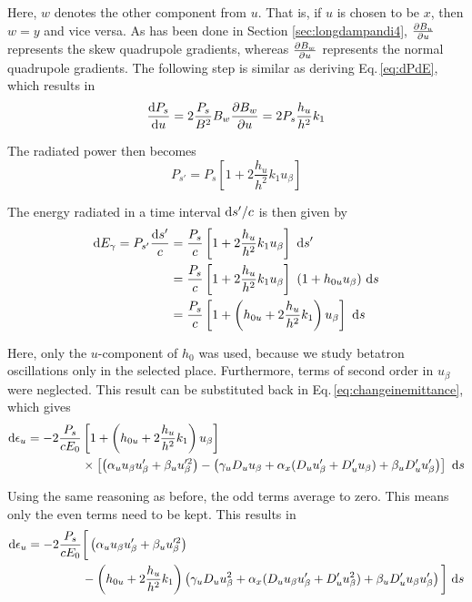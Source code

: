 Here, $w$ denotes the other component from $u$. That is, if $u$ is chosen to be $x$, then $w = y$ and vice versa. As has been done in Section \ref{sec:longdampandi4}, $\frac{\partial {B_u}}{\partial {u}}$ represents the skew quadrupole gradients, whereas $\frac{\partial {B_w}}{\partial {u}}$ represents the normal quadrupole gradients. The following step is similar as deriving Eq.\,\ref{eq:dPdE}, which results in
\begin{equation}
    \frac{\text{d} {P_s}}{\text{d} {u}} = 2 \frac{P_s}{B^2} B_w \frac{\partial {B_w}}{\partial {u}} = 2 P_s \frac{h_u}{h^2} k_1
\end{equation}

The radiated power then becomes
\begin{equation}
    P_{s'} = P_s \left[ 1 + 2 \frac{h_u}{h^2} k_1 u_\beta \right]
\end{equation}

The energy radiated in a time interval $\text{d} s' / c$ is then given by
\begin{align}
    \text{d} E_\gamma = P_{s'} \frac{\text{d} s'}{c} &= \frac{P_s}{c} \left[ 1 + 2 \frac{h_u}{h^2} k_1 u_\beta \right]\ \text{d} s' \notag\\
                                             &= \frac{P_s}{c} \left[ 1 + 2 \frac{h_u}{h^2} k_1 u_\beta \right]\ (1 + h_{0u} u_\beta)\ \text{d} s \notag\\
                                             &= \frac{P_s}{c} \left[ 1 + \left( h_{0u} + 2 \frac{h_u}{h^2} k_1 \right) u_\beta \right]\ \text{d} s
\end{align}

Here, only the $u$-component of $h_0$ was used, because we study betatron oscillations only in the selected place. Furthermore, terms of second order in $u_\beta$ were neglected. This result can be substituted back in Eq.\,\ref{eq:changeinemittance}, which gives
\begin{align}
    \dee \epsilon_u = - 2 \frac{P_s}{cE_0} &\left[ 1 + \left( h_{0u} + 2 \frac{h_u}{h^2} k_1 \right) u_\beta \right]  \notag \\
                    & \times \left[ \left( \alpha_u u_\beta u_\beta' + \beta_u u_\beta'^2 \right)  - \left( \gamma_u D_u u_\beta + \alpha_x (D_u u_\beta' + D_u' u_\beta) + \beta_u D_u' u_\beta' \right)\right] \ \dee s
\end{align}

Using the same reasoning as before, the odd terms average to zero. This means only the even terms need to be kept. This results in
\begin{align}
    \text{d} \epsilon_u = - 2 \frac{P_s}{cE_0} &\bigg[ \left( \alpha_u u_\beta u_\beta' + \beta_u u_\beta'^2 \right) \notag\\
    &- \left( h_{0u} + 2 \frac{h_u}{h^2} k_1 \right) \left( \gamma_u D_u u_\beta^2 + \alpha_x (D_u u_\beta u_\beta' + D_u' u_\beta^2) + \beta_u D_u' u_\beta u_\beta' \right) \bigg]\ \text{d} s
\end{align}

